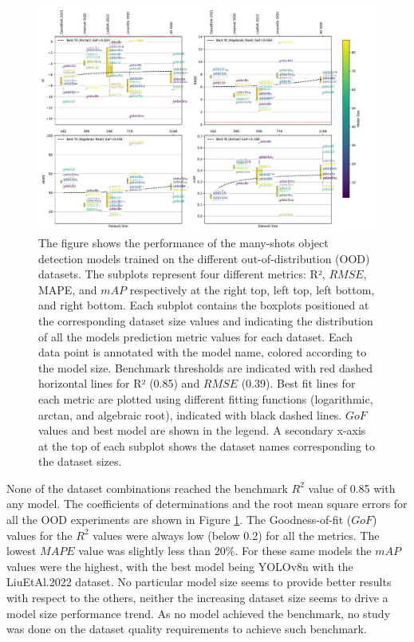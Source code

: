 \documentclass[12pt,a4paper,oneside]{report}
\begin{document}
\begin{figure}[H]
\centering
\includegraphics[width=\textwidth]{Plots/metrics_OOD_datasets.pdf}
\caption{The figure shows the performance of the many-shots object detection models 
trained on 
the different out-of-distribution (OOD) datasets. The subplots represent four different metrics: 
R², $RMSE$, MAPE, and $mAP$ respectively at the right top, left top, left bottom, and right bottom.
Each subplot contains the boxplots
positioned at the corresponding dataset size values and indicating the distribution of
all the models prediction metric values for each dataset.
Each data point is annotated with the model name, colored according 
to the model size. Benchmark thresholds are indicated with red 
dashed horizontal lines for R² (0.85) and $RMSE$ (0.39). Best fit lines for each metric are 
plotted using different fitting functions (logarithmic, arctan, and algebraic root), 
indicated with black dashed lines. $GoF$ values and best model are shown in the
legend.
A secondary x-axis at the top of each subplot 
shows the dataset names corresponding to the dataset sizes.}
\label{fig:metrics_OOD_datasets}
\end{figure}

None of the dataset combinations reached the benchmark $R^2$ value of 0.85 with any model.
The coefficients of determinations and the root mean square errors 
for all the OOD experiments are shown in Figure \ref{fig:metrics_OOD_datasets}.
The Goodness-of-fit ($GoF$) values for the $R^2$ values were always low (below 0.2) for all the metrics.
The lowest $MAPE$ value was slightly less than 20\%. For these same models the $mAP$ values
were the highest, with the best model being YOLOv8n with the LiuEtAl.2022 dataset.
No particular model size seems to provide better results with respect to the others,
neither the increasing dataset size seems to drive a model size performance trend.
As no model achieved the benchmark, no study was done on the dataset quality requirements
to achieve such benchmark.
\end{document}
